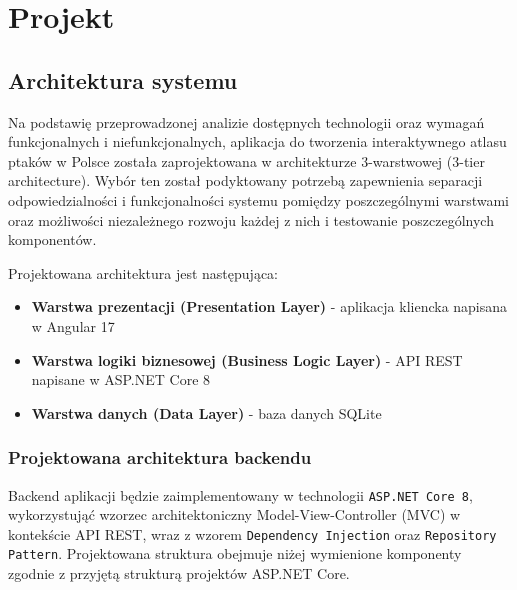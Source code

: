 %


\sloppy

\chapter{Projekt}
\label{rozdzial3}

\section{Architektura systemu}
Na podstawię przeprowadzonej analizie dostępnych technologii oraz wymagań funkcjonalnych i niefunkcjonalnych, aplikacja do tworzenia interaktywnego atlasu ptaków w Polsce została zaprojektowana w architekturze 3-warstwowej (3-tier architecture). Wybór ten został podyktowany potrzebą zapewnienia separacji odpowiedzialności i funkcjonalności systemu pomiędzy poszczególnymi warstwami oraz możliwości niezależnego rozwoju każdej z nich i testowanie poszczególnych komponentów.


Projektowana architektura jest następująca:
\begin{itemize}
	\item \textbf{Warstwa prezentacji (Presentation Layer)} - aplikacja kliencka napisana w Angular 17
	\item \textbf{Warstwa logiki biznesowej (Business Logic Layer)} - API REST napisane w ASP.NET Core 8
	\item \textbf{Warstwa danych (Data Layer)} - baza danych SQLite
\end{itemize}

\subsection{Projektowana architektura backendu}
Backend aplikacji będzie zaimplementowany w technologii \texttt{ASP.NET Core 8}, wykorzystująć wzorzec architektoniczny Model-View-Controller (MVC) w kontekście API REST, wraz z wzorem \texttt{Dependency Injection} oraz \texttt{Repository Pattern}. Projektowana struktura obejmuje niżej wymienione komponenty zgodnie z przyjętą strukturą projektów ASP.NET Core.

